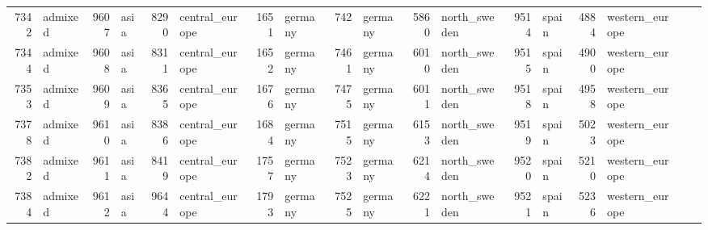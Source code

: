 \begin{table}[h]
{\begin{tabular}{rl|rl|rl|rl|rl|rl|rl|rl|rl}
			7342                   & admixed         & 9607                   & asia            & 8290                   & central\_europe & 1651                   & germany         & 742                    & germany                 & 5860                   & north\_sweden           & 9514                   & spain           & 4884                   & western\_europe &                          &                 \\
			7344                   & admixed         & 9608                   & asia            & 8311                   & central\_europe & 1652                   & germany         & 7461                   & germany                 & 6010                   & north\_sweden           & 9515                   & spain           & 4900                   & western\_europe &                          &                 \\
			7353                   & admixed         & 9609                   & asia            & 8365                   & central\_europe & 1676                   & germany         & 7475                   & germany                 & 6011                   & north\_sweden           & 9518                   & spain           & 4958                   & western\_europe &                          &                 \\
			7378                   & admixed         & 9610                   & asia            & 8386                   & central\_europe & 1684                   & germany         & 7515                   & germany                 & 6153                   & north\_sweden           & 9519                   & spain           & 5023                   & western\_europe &                          &                 \\
			7382                   & admixed         & 9611                   & asia            & 8419                   & central\_europe & 1757                   & germany         & 7523                   & germany                 & 6214                   & north\_sweden           & 9520                   & spain           & 5210                   & western\_europe &                          &                 \\
			7384                   & admixed         & 9612                   & asia            & 9644                   & central\_europe & 1793                   & germany         & 7525                   & germany                 & 6221                   & north\_sweden           & 9521                   & spain           & 5236                   & western\_europe &                          &                 \\

\end{tabular}}
\end{table}
